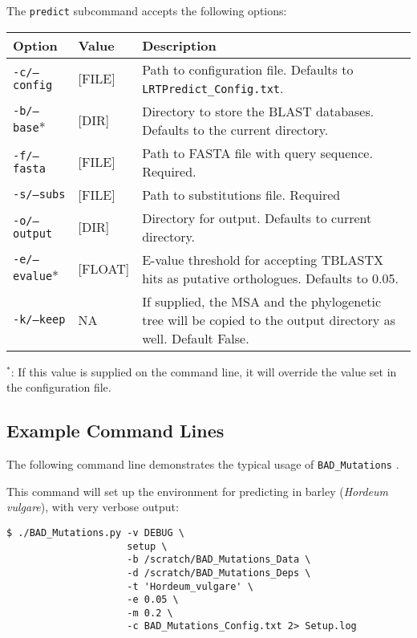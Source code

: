 \documentclass[12pt]{article}
\newcommand{\BM}{\texttt{BAD\_Mutations} }
\begin{document}
\par The \texttt{predict} subcommand accepts the following options:
\begin{table}[H]
    \centering
    \begin{tabular}{p{105pt} l p{260pt}}
    \toprule
    Option & Value & Description \\
    \midrule
    \texttt{-c/--config} & [FILE] & Path to configuration file. Defaults to \texttt{LRTPredict\_Config.txt}. \\
    \midrule
    \texttt{-b/--base}* & [DIR] & Directory to store the BLAST databases. Defaults to the current directory.\\
    \midrule
    \texttt{-f/--fasta} & [FILE] & Path to FASTA file with query sequence. Required.\\
    \midrule
    \texttt{-s/--subs} & [FILE] & Path to substitutions file. Required\\
    \midrule
	\texttt{-o/--output} & [DIR] & Directory for output. Defaults to current directory.\\
	\midrule
    \texttt{-e/--evalue}* & [FLOAT] & E-value threshold for accepting TBLASTX hits as putative orthologues. Defaults to 0.05.\\
	\midrule
	\texttt{-k/--keep} & NA & If supplied, the MSA and the phylogenetic tree will be copied to the output directory as well. Default False.\\
    \bottomrule
    \end{tabular}
\end{table}
\par $^*$: If this value is supplied on the command line, it will override
the value set in the configuration file.

\subsection*{Example Command Lines}
\par The following command line demonstrates the typical usage of \BM.

\par This command will set up the environment for predicting in barley
(\textit{Hordeum vulgare}), with very verbose output:
\begin{Verbatim}[frame=single, fontsize=\small, rulecolor=\color{gray}]
$ ./BAD_Mutations.py -v DEBUG \
                     setup \
                     -b /scratch/BAD_Mutations_Data \
                     -d /scratch/BAD_Mutations_Deps \
                     -t 'Hordeum_vulgare' \
                     -e 0.05 \
                     -m 0.2 \
                     -c BAD_Mutations_Config.txt 2> Setup.log
\end{Verbatim}
\end{document}
